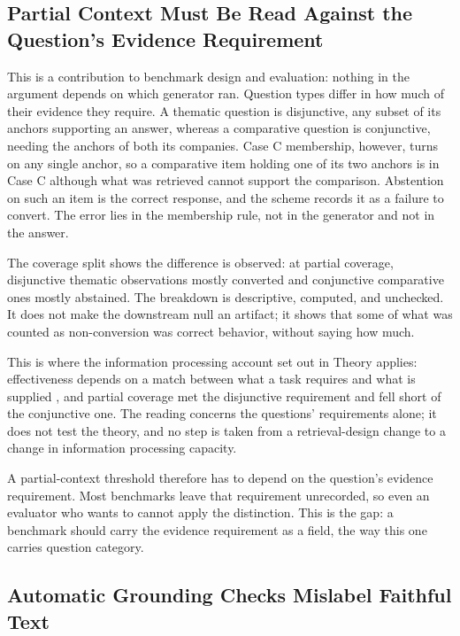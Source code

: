 \subsection{Partial Context Must Be Read Against the Question's Evidence
Requirement}

This is a contribution to benchmark design and evaluation: nothing in the
argument depends on which generator ran. Question
types differ in how much of their evidence they require. A thematic question is
disjunctive, any subset of its anchors supporting an answer, whereas a
comparative question is conjunctive, needing the anchors of both its companies.
Case C membership, however, turns on any single anchor, so a comparative item
holding one of its two anchors is in Case C although what was retrieved cannot
support the comparison. Abstention on such an item is the correct response, and
the scheme records it as a failure to convert. The error lies in the membership
rule, not in the generator and not in the answer.

The coverage split shows the difference is observed: at
partial coverage, disjunctive thematic observations mostly converted and
conjunctive comparative ones mostly abstained. The breakdown is descriptive,
computed, and unchecked. It does not make the downstream null an artifact; it
shows that some of what was counted as non-conversion was correct behavior,
without saying how much.

This is where the information processing account set out in Theory applies:
effectiveness depends on a match between what a task requires and what is
supplied \parencite[619, 622]{tushman1978}, and partial coverage met the
disjunctive requirement and fell short of the conjunctive one. The reading concerns the questions' requirements alone; it does
not test the theory, and no step is taken from a retrieval-design change to a
change in information processing capacity.

A partial-context threshold therefore has to depend on the question's evidence
requirement. Most benchmarks leave that requirement unrecorded, so even an
evaluator who wants to cannot apply the distinction. This is the gap: a
benchmark should carry the evidence requirement as a field, the way this one
carries question category.

\subsection{Automatic Grounding Checks Mislabel Faithful Text}

